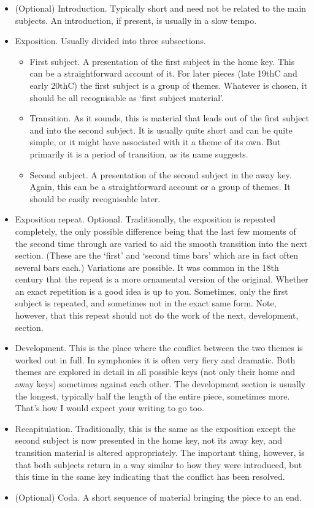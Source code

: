 \documentclass[a4paper]{article}
\begin{document}
\begin{itemize}
\item (Optional) Introduction.  Typically short and
  need not be related to the main subjects. An introduction,
  if present, is usually in a slow tempo.
\item Exposition. Usually divided into three subsections.
\begin{itemize}
\item First subject.  A presentation of the first subject in the
  home key.  This can be a straightforward account of it.  For
  later pieces (late 19thC and early 20thC) the
  first subject is a group of themes.  Whatever is chosen, it
  should be all recognisable as `first subject material'.
\item Transition.  As it sounds, this is material that leads out
  of the first subject and into the second subject.  It is usually
  quite short and can be quite simple, or it might have associated
  with it a theme of its own.  But primarily it is a period
  of transition, as its name suggests.
\item Second subject.  A presentation of the second subject in the
  away key.  Again, this can be a straightforward account
  or a group of themes.  It should be easily recognisable later.
\end{itemize}
\item Exposition repeat.  Optional.  Traditionally, the
  exposition is repeated completely, the only possible difference
  being that the last few moments of the second time through
  are varied to aid the smooth
  transition into the next section. (These are the `first' and `second time
  bars' which are in fact often several bars each.)  Variations are
  possible. It was common in the 18th century that
  the repeat is a more ornamental version of the original.
  Whether an exact repetition is a good idea is
  up to you.  Sometimes, only the first subject is repeated, and
  sometimes not in the exact same form. Note, however, that this
  repeat should not do the work of the next, development, section.
\item Development. This is the place where the conflict between the
  two themes is worked out in full.  In symphonies it is often very fiery
  and dramatic. Both themes are explored in detail in all possible keys
  (not only their home and away keys) sometimes against each other.
  The development section is usually the longest, typically half
  the length of the entire piece, sometimes more.  That's how I would expect
  your writing to go too.
\item Recapitulation. Traditionally, this is the same as the exposition
  except the second subject is now presented in the home key,
  not its away key, and transition material is altered appropriately.
  The important thing, however, is that both subjects return
  in a way similar to how they were introduced, but this time in the same key
  indicating that the conflict has been resolved.
\item (Optional) Coda.  A short sequence of material bringing the
  piece to an end.
\end{itemize}
\end{document}
